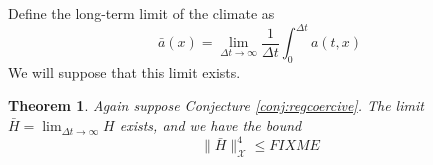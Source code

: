\documentclass[12pt]{article}
\newtheorem{theorem}{Theorem}
\newcommand{\cX}{\ensuremath{\mathcal{X}}}
\begin{document}
Define the long-term limit of the climate as
\begin{equation}
\bar a(x) = \lim_{\Delta t \to \infty} \frac{1}{\Delta t} \int_0^{\Delta t} a(t,x)
\end{equation}
We will suppose that this limit exists.

\begin{theorem}
Again suppose Conjecture \ref{conj:regcoercive}.  The limit $\bar H = \lim_{\Delta t\to \infty} H$ exists, and we have the bound
\begin{equation}
\|\bar H\|_{\cX}^4 \le FIXME \label{eq:longbound}
\end{equation}
\end{theorem}



\end{document}
